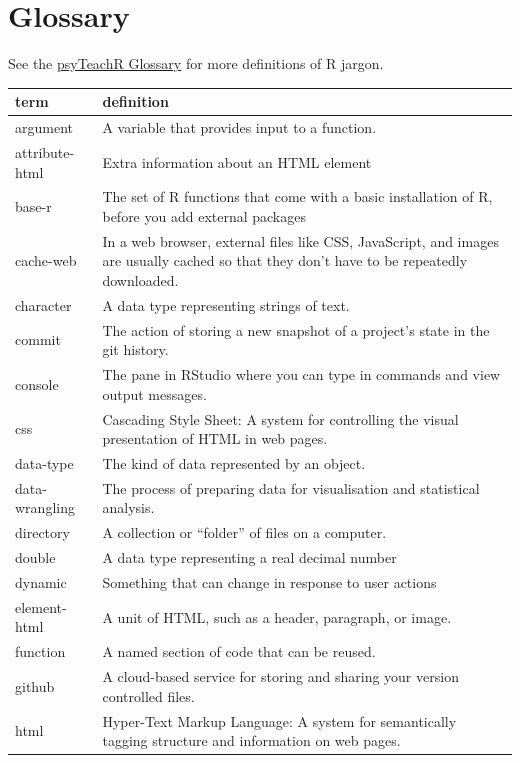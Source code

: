 \documentclass[
  oneside]{book}
\begin{document}
\hypertarget{glossary}{%
\chapter{Glossary}\label{glossary}}

See the \href{https://psyteachr.github.io/glossary/}{psyTeachR Glossary} for more definitions of R jargon.

\begin{tabular}{l|l}
\hline
term & definition\\
\hline
argument & A variable that provides input to a function.\\
\hline
attribute-html & Extra information about an HTML element\\
\hline
base-r & The set of R functions that come with a basic installation of R, before you add external packages\\
\hline
cache-web & In a web browser, external files like CSS, JavaScript, and images are usually cached so that they don’t have to be repeatedly downloaded.\\
\hline
character & A data type representing strings of text.\\
\hline
commit & The action of storing a new snapshot of a project’s state in the git history.\\
\hline
console & The pane in RStudio where you can type in commands and view output messages.\\
\hline
css & Cascading Style Sheet: A system for controlling the visual presentation of HTML in web pages.\\
\hline
data-type & The kind of data represented by an object.\\
\hline
data-wrangling & The process of preparing data for visualisation and statistical analysis.\\
\hline
directory & A collection or “folder” of files on a computer.\\
\hline
double & A data type representing a real decimal number\\
\hline
dynamic & Something that can change in response to user actions\\
\hline
element-html & A unit of HTML, such as a header, paragraph, or image.\\
\hline
function & A named section of code that can be reused.\\
\hline
github & A cloud-based service for storing and sharing your version controlled files.\\
\hline
html & Hyper-Text Markup Language: A system for semantically tagging structure and information on web pages.\\

\end{tabular}
\end{document}
